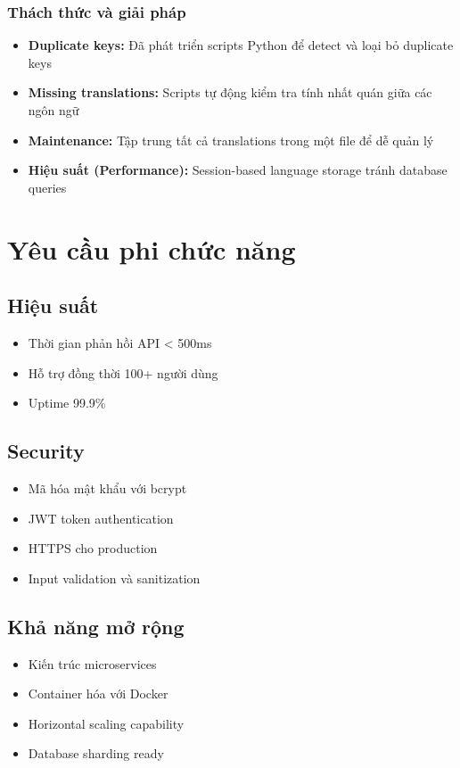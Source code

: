 \documentclass[12pt,a4paper]{report}
\begin{document}
\subsubsection{Thách thức và giải pháp}
\begin{itemize}
    \item \textbf{Duplicate keys:} Đã phát triển scripts Python để detect và loại bỏ duplicate keys
    \item \textbf{Missing translations:} Scripts tự động kiểm tra tính nhất quán giữa các ngôn ngữ
    \item \textbf{Maintenance:} Tập trung tất cả translations trong một file để dễ quản lý
    \item \textbf{Hiệu suất (Performance):} Session-based language storage tránh database queries
\end{itemize}

\section{Yêu cầu phi chức năng}

\subsection{Hiệu suất}
\begin{itemize}
    \item Thời gian phản hồi API < 500ms
    \item Hỗ trợ đồng thời 100+ người dùng
    \item Uptime 99.9\%
\end{itemize}

\subsection{Security}
\begin{itemize}
    \item Mã hóa mật khẩu với bcrypt
    \item JWT token authentication
    \item HTTPS cho production
    \item Input validation và sanitization
\end{itemize}

\subsection{Khả năng mở rộng}
\begin{itemize}
    \item Kiến trúc microservices
    \item Container hóa với Docker
    \item Horizontal scaling capability
    \item Database sharding ready
\end{itemize}
\end{document}
